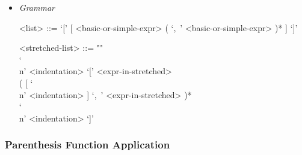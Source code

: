 \documentclass{article}
\begin{document}
\begin{itemize}
\item \textit{Grammar}
\begin{grammar}
<list> ::= `[' [ <basic-or-simple-expr> ( `,\ ' <basic-or-simple-expr> )* ] `]'

<stretched-list> ::= ""\\
`\\n' <indentation> `[' <expr-in-stretched> \\
( [ `\\n' <indentation> ] `,\ ' <expr-in-stretched> )* \\
`\\n' <indentation> `]'
\end{grammar}

\end{itemize}

\subsubsection{Parenthesis Function Application}
\label{subsec:parenfuncapp}
\end{document}
